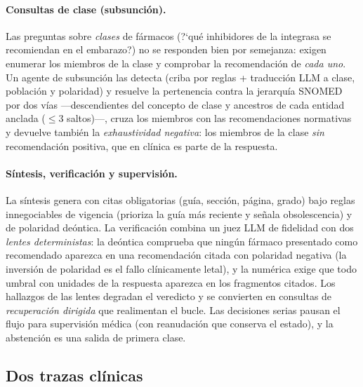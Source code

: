 \documentclass[11pt,a4paper]{article}
\begin{document}
\paragraph{Consultas de clase (subsunción).}
Las preguntas sobre \emph{clases} de fármacos (\guillemotleft{}?`qué inhibidores de la
integrasa se recomiendan en el embarazo?\guillemotright{}) no se responden bien por
semejanza: exigen enumerar los miembros de la clase y comprobar la
recomendación de \emph{cada uno}. Un agente de subsunción las detecta
(criba por reglas + traducción LLM a clase, población y polaridad) y
resuelve la pertenencia contra la jerarquía SNOMED por dos vías
---descendientes del concepto de clase y ancestros de cada entidad anclada
($\le 3$ saltos)---, cruza los miembros con las recomendaciones normativas
y devuelve también la \emph{exhaustividad negativa}: los miembros de la
clase \emph{sin} recomendación positiva, que en clínica es parte de la
respuesta.

\paragraph{Síntesis, verificación y supervisión.}
La síntesis genera con citas obligatorias (guía, sección, página, grado)
bajo reglas innegociables de vigencia (prioriza la guía más reciente y
señala obsolescencia) y de polaridad deóntica. La verificación combina un
juez LLM de fidelidad con dos \emph{lentes deterministas}: la deóntica
comprueba que ningún fármaco presentado como recomendado aparezca en una
recomendación citada con polaridad negativa (la inversión de polaridad es
el fallo clínicamente letal), y la numérica exige que todo umbral con
unidades de la respuesta aparezca en los fragmentos citados. Los hallazgos
de las lentes degradan el veredicto y se convierten en consultas de
\emph{recuperación dirigida} que realimentan el bucle. Las decisiones
serias pausan el flujo para supervisión médica (con reanudación que
conserva el estado), y la abstención es una salida de primera clase.

\subsection{Dos trazas clínicas}
\label{sec:gesida-trazas}
\end{document}
